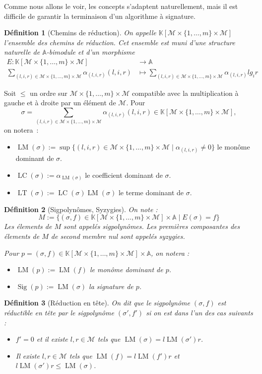\documentclass{article}
\newtheorem*{dfn}{Définition}
\newcommand{\K}{\mathbb{K}}
\newcommand{\A}{\mathbb{A}}
\newcommand{\M}{\mathcal{M}}
\newcommand{\CR}{\K[\M\times\{1, \dots, m\}\times\M]}
\DeclareMathOperator{\LM}{LM}
\DeclareMathOperator{\LC}{LC}
\DeclareMathOperator{\LT}{LT}
\DeclareMathOperator{\Sig}{Sig}
\begin{document}
Comme nous allons le voir, les concepts s'adaptent naturellement, mais il est difficile de garantir la terminaison d'un algorithme à signature.

\begin{dfn}[Chemins de réduction]
	On appelle $\CR$ l'ensemble des chemins de réduction.
	Cet ensemble est muni d'une structure naturelle de $\A$-bimodule et d'un morphisme 
	\begin{align*}
		E : \CR &\rightarrow \A \\
		\sum_{(l, i, r) \in \M\times\{1,\dots,m\}\times\M} \alpha_{(l,i,r)}(l,i,r) &\mapsto \sum_{(l, i, r) \in \M\times\{1,\dots,m\}\times\M} \alpha_{(l,i,r)}lg_ir
	\end{align*}
\end{dfn}

Soit $\leq$ un ordre sur $\M\times\{1,\dots,m\}\times\M$ compatible avec la multiplication à gauche et à droite par un élément de $\M$.
Pour 
$$\sigma = \sum_{(l, i, r) \in \M\times\{1,\dots,m\}\times\M} \alpha_{(l,i,r)}(l,i,r) \in \CR,$$
on notera~:
\begin{itemize}
\item $\LM(\sigma) := \sup \{ (l, i, r) \in \M\times\{1,\dots,m\}\times\M \;|\; \alpha_{(l, i, r)} \neq 0 \}$ le monôme dominant de $\sigma$.
\item $\LC(\sigma) := \alpha_{\LM(\sigma)}$ le coefficient dominant de $\sigma$.
\item $\LT(\sigma) := \LC(\sigma)\LM(\sigma)$ le terme dominant de $\sigma$.
\end{itemize}

\begin{dfn}[Sigpolynômes, Syzygies]
	On note :
	$$M := \{(\sigma, f) \in \CR\times\A \;|\; E(\sigma) = f\}$$
	Les élements de $M$ sont appelés sigpolynômes.
	Les premières composantes des élements de $M$ de second membre nul sont appelés syzygies.
	
	Pour $p = (\sigma, f) \in \CR\times\A$, on notera :
	\begin{itemize}
	\item $\LM(p) := \LM(f)$ le monôme dominant de $p$.
	\item $\Sig(p) := \LM(\sigma)$ la signature de $p$.
	\end{itemize}
\end{dfn}

\begin{dfn}[Réduction en tête]
	On dit que le sigpolynôme $(\sigma, f)$ est réductible en tête par le sigpolynôme $(\sigma', f')$ si on est dans l'un des cas suivants :
	\begin{itemize}
	\item $f' = 0$ et il existe $l, r \in \M$ tels que $\LM(\sigma) = l\LM(\sigma')r$.
	\item Il existe $l, r \in \M$ tels que $\LM(f) = l\LM(f')r$ et $l\LM(\sigma')r \leq \LM(\sigma)$.
	\end{itemize}
\end{dfn}
\end{document}
